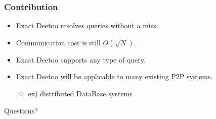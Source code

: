 \documentclass[red]{beamer}
\begin{document}
\begin{frame}
\frametitle{Contribution}
\begin{itemize}
\item Exact Deetoo resolves queries without a miss.
\item Communication cost is still $O(\sqrt{N})$.
\item Exact Deetoo supports any type of query.
\item Exact Deetoo will be applicable to many existing P2P systems.
\begin{itemize}
\item ex) distributed DataBase systems
\end{itemize}
\end{itemize}
\end{frame}

\begin{frame}
\begin{center}
\centering                        \huge Questions?
\end{center}
\end{frame}
\end{document}
